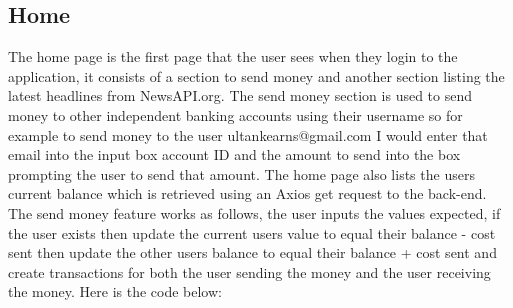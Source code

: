 \subsection{Home}
The home page is the first page that the user sees when they login to the application, it consists of a section to send money and another section listing the latest headlines from NewsAPI.org.  The send money section is used to send money to other independent banking accounts using their username so for example to send money to the user ultankearns@gmail.com I would enter that email into the input box account ID and the amount to send into the box prompting the user to send that amount.  The home page also lists the users current balance which is retrieved using an Axios get request to the back-end.
\\
The send money feature works as follows, the user inputs the values expected, if the user exists then update the current users value to equal their balance - cost sent then update the other users balance to equal their balance + cost sent and create transactions for both the user sending the money and the user receiving the money.  Here is the code below:
